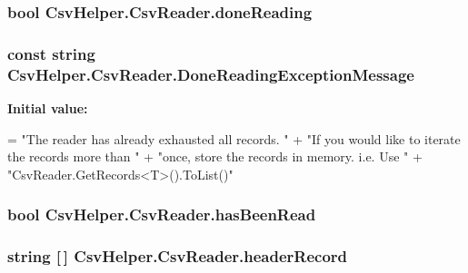 \hypertarget{a00057_a04a4a668ae50f5383cdd2a1691bbd718}{
\subsubsection[{done\-Reading}]{\setlength{\rightskip}{0pt plus 5cm}bool Csv\-Helper.\-Csv\-Reader.\-done\-Reading\hspace{0.3cm}{\ttfamily [private]}}}\label{a00057_a04a4a668ae50f5383cdd2a1691bbd718}
\hypertarget{a00057_abea2bd0359f517019984de31f9d9fb96}{
\subsubsection[{Done\-Reading\-Exception\-Message}]{\setlength{\rightskip}{0pt plus 5cm}const string Csv\-Helper.\-Csv\-Reader.\-Done\-Reading\-Exception\-Message\hspace{0.3cm}{\ttfamily [private]}}}\label{a00057_abea2bd0359f517019984de31f9d9fb96}
{\bfseries Initial value\-:}
\begin{DoxyCode}
=
            \textcolor{stringliteral}{"The reader has already exhausted all records. "} +
            \textcolor{stringliteral}{"If you would like to iterate the records more than "} +
            \textcolor{stringliteral}{"once, store the records in memory. i.e. Use "} +
            \textcolor{stringliteral}{"CsvReader.GetRecords<T>().ToList()"}
\end{DoxyCode}
\hypertarget{a00057_a34d0725235d140229f6a07e4c3b83552}{
\subsubsection[{has\-Been\-Read}]{\setlength{\rightskip}{0pt plus 5cm}bool Csv\-Helper.\-Csv\-Reader.\-has\-Been\-Read\hspace{0.3cm}{\ttfamily [private]}}}\label{a00057_a34d0725235d140229f6a07e4c3b83552}
\hypertarget{a00057_aa6e5fd8aa2961442ca1caf7a4ac54d65}{
\subsubsection[{header\-Record}]{\setlength{\rightskip}{0pt plus 5cm}string \mbox{[}$\,$\mbox{]} Csv\-Helper.\-Csv\-Reader.\-header\-Record\hspace{0.3cm}{\ttfamily [private]}}}\label{a00057_aa6e5fd8aa2961442ca1caf7a4ac54d65}
